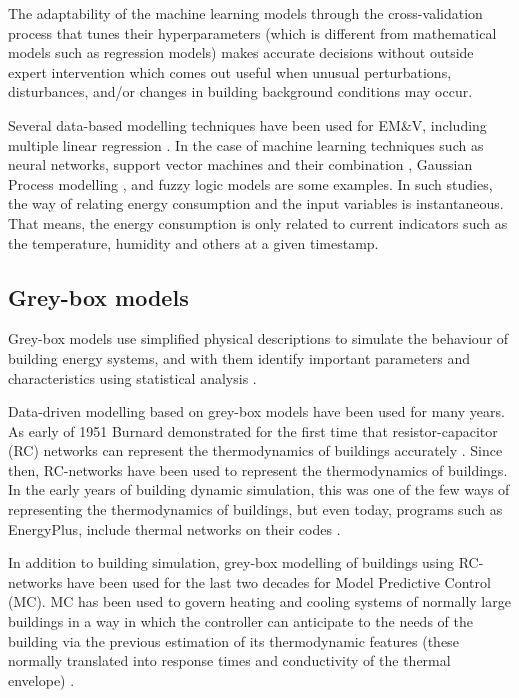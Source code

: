 \documentclass[10pt, conference, compsocconf]{IEEEtran}
\begin{document}
The adaptability of the machine learning models through the cross-validation process that tunes their hyperparameters (which is different from mathematical models such as regression models) makes accurate decisions without outside expert intervention which comes out useful when unusual perturbations, disturbances, and/or changes in building background conditions may occur.

Several data-based modelling techniques have been used for EM\&V, including multiple linear regression \cite{braun2014using}.  %
In the case of machine learning techniques such as neural networks, support vector machines and their combination \cite{ahmad2014review}, Gaussian Process modelling \cite{heo2012gaussian}, and fuzzy logic models \cite{ciabattoni2014fuzzy} are some examples. In such studies, the way of relating energy consumption and the input variables is instantaneous. That means, the energy consumption is only related to current indicators such as the temperature, humidity and others at a given timestamp.
  

\subsection{Grey-box models}

Grey-box models use simplified physical descriptions to simulate the behaviour of building energy systems, and with them identify important parameters and characteristics using statistical analysis \cite{handbook2017american}.

Data-driven modelling based on grey-box models have been used for many years. As early of 1951 Burnard demonstrated for the first time that resistor-capacitor (RC) networks can represent the thermodynamics of buildings accurately \cite{burnand1952study}. Since then, RC-networks have been used to represent the thermodynamics of buildings. In the early years of building dynamic simulation, this was one of the few ways of representing the thermodynamics of buildings, but even today, programs such as EnergyPlus, include thermal networks on their codes \cite{handbook2017american} .

In addition to building simulation, grey-box modelling of buildings using RC-networks have been used for the last two decades for Model Predictive Control (MC). MC has been used to govern heating and cooling systems of normally large buildings in a way in which the controller can anticipate to the needs of the building via the previous estimation of its thermodynamic features (these normally translated into response times and conductivity of the thermal envelope) \cite{coley1992second}.
\end{document}
